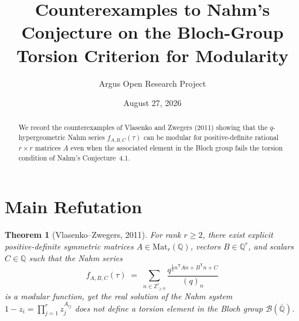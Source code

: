 \documentclass[10pt,reqno]{amsart}
\title[Counterexamples to Nahm's Conjecture 4.1 on $q$-Hypergeometric Modularity]
{Counterexamples to Nahm's Conjecture on the Bloch-Group Torsion Criterion for Modularity}
\author{Argus Open Research Project}
\date{August 27, 2026}
\newtheorem{theorem}{Theorem}[section]
\theoremstyle{definition}
\begin{document}
\begin{abstract}
We record the counterexamples of Vlasenko and Zwegers (2011) showing that the $q$-hypergeometric Nahm series $f_{A,B,C}(\tau)$ can be modular for positive-definite rational $r\times r$ matrices $A$ even when the associated element in the Bloch group fails the torsion condition of Nahm's Conjecture~4.1.
\end{abstract}
\maketitle
\section{Main Refutation}
\begin{theorem}[Vlasenko--Zwegers, 2011]
For rank $r\ge 2$, there exist explicit positive-definite symmetric matrices $A\in\mathrm{Mat}_r(\mathbb{Q})$, vectors $B\in\mathbb{Q}^r$, and scalars $C\in\mathbb{Q}$ such that the Nahm series
\[
  f_{A,B,C}(\tau) \;=\; \sum_{n\in\mathbb{Z}_{\ge 0}^r} \frac{q^{\frac{1}{2}n^{\mathsf T}An + B^{\mathsf T}n + C}}{(q)_n}
\]
is a modular function, yet the real solution of the Nahm system $1-z_i=\prod_{j=1}^r z_j^{A_{ij}}$ does not define a torsion element in the Bloch group $\mathcal{B}(\overline{\mathbb{Q}})$.
\end{theorem}
\end{document}
